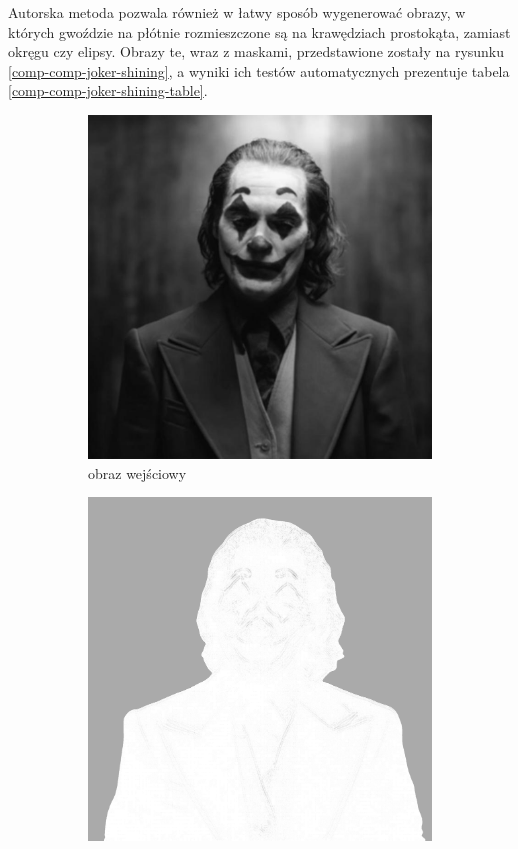 \documentclass[a4paper, 12pt, polish, twoside]{extreport}
\begin{document}
	Autorska metoda pozwala również w łatwy sposób wygenerować obrazy, w których gwoździe na płótnie rozmieszczone są na krawędziach prostokąta, zamiast okręgu czy elipsy. Obrazy te, wraz z maskami, przedstawione zostały na rysunku \ref{comp-comp-joker-shining}, a wyniki ich testów automatycznych prezentuje tabela \ref{comp-comp-joker-shining-table}.
	\begin{figure}[H] 
    \centering
    \begin{subfigure}{0.32\textwidth}
        \centering
        \includegraphics[width = \textwidth]{img/6-comp/joker_original_c10_inv0.png}
        \caption{obraz wejściowy}
        \label{comp-comp-joker-shining-a}
    \end{subfigure}
    \begin{subfigure}{0.32\textwidth}
        \centering
        \includegraphics[width = \textwidth]{img/6-comp/joker_mask_c20_inv0_bg10_obj5_ed5.png}

\end{subfigure}
\end{figure}
\end{document}
